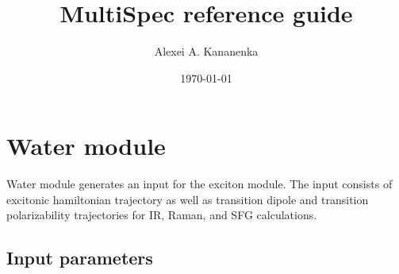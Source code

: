 \documentclass{article}
\begin{document}
\title{MultiSpec reference guide}
\author{Alexei A. Kananenka}
\date{\today}
\maketitle

\section{Water module}
Water module generates an input for the exciton module. The input consists of excitonic hamiltonian trajectory as well as 
transition dipole and transition polarizability trajectories for IR, Raman, and SFG calculations.

\subsection{Input parameters}
\end{document}
